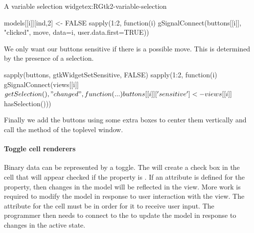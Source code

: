 \begin{example}{A variable selection widget}{ex:RGtk2-variable-selection}
\begin{Schunk}
\begin{Sinput}
{   models[[i]][ind,2] <- FALSE
 }
 sapply(1:2, function(i) 
   gSignalConnect(buttons[[i]], "clicked", move, data=i, user.data.first=TRUE))
\end{Sinput}
\end{Schunk}
%
We only want our buttons sensitive if there is a possible move. This
is determined by the presence of a selection.
\begin{Schunk}
\begin{Sinput}
 sapply(buttons, gtkWidgetSetSensitive, FALSE) 
 sapply(1:2, function(i) 
        gSignalConnect(views[[i]]$getSelection(), "changed", function(...) 
                       buttons[[i]]['sensitive'] <- views[[i]]$hasSelection()))
\end{Sinput}
\end{Schunk}
%
Finally we add the buttons using some extra boxes to center them
vertically and call the  method of the toplevel window.
\begin{Schunk}
\end{Schunk}


\end{example}


\paragraph{Toggle cell renderers}

Binary data can be represented by a toggle. The
 will create a check box in the
cell that will appear checked if the  property is
. If an attribute is defined for the property, then changes
in the model will be reflected in the view. More work is required to
modify the model in response to user interaction with the view. The
 attribute for the cell must be  in order
for it to receive user input. The programmer then needs to connect to the
 to update the model in response to changes in the
active state.
\begin{Schunk}
\end{Schunk}

